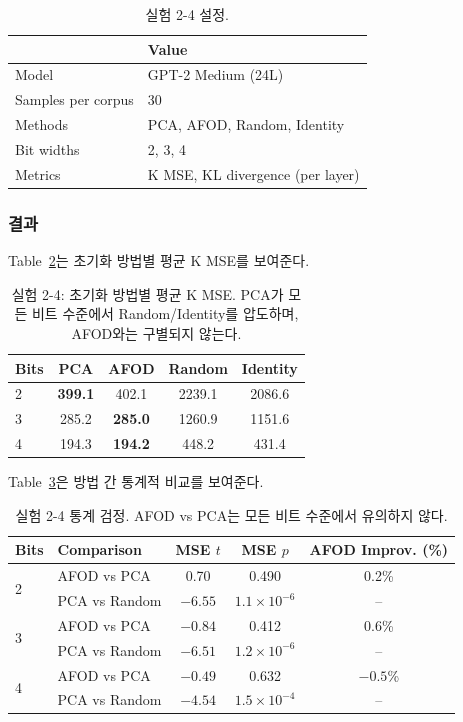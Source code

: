 \documentclass[11pt,a4paper]{article}
\begin{document}
\begin{table}[H]
\centering
\caption{실험 2-4 설정.}
\label{tab:exp24_setup}
\begin{tabular}{ll}
\toprule
\textbf{} & \textbf{Value} \\
\midrule
Model & GPT-2 Medium (24L) \\
Samples per corpus & 30 \\
Methods & PCA, AFOD, Random, Identity \\
Bit widths & 2, 3, 4 \\
Metrics & K MSE, KL divergence (per layer) \\
\bottomrule
\end{tabular}
\end{table}

\subsubsection{결과}

Table~\ref{tab:exp24_mse}는 초기화 방법별 평균 K MSE를 보여준다.

\begin{table}[H]
\centering
\caption{실험 2-4: 초기화 방법별 평균 K MSE. PCA가 모든 비트 수준에서 Random/Identity를 압도하며, AFOD와는 구별되지 않는다.}
\label{tab:exp24_mse}
\begin{tabular}{lcccc}
\toprule
\textbf{Bits} & \textbf{PCA} & \textbf{AFOD} & \textbf{Random} & \textbf{Identity} \\
\midrule
2 & \textbf{399.1} & 402.1 & 2239.1 & 2086.6 \\
3 & 285.2 & \textbf{285.0} & 1260.9 & 1151.6 \\
4 & 194.3 & \textbf{194.2} & 448.2 & 431.4 \\
\bottomrule
\end{tabular}
\end{table}

Table~\ref{tab:exp24_stat}은 방법 간 통계적 비교를 보여준다.

\begin{table}[H]
\centering
\caption{실험 2-4 통계 검정. AFOD vs PCA는 모든 비트 수준에서 유의하지 않다.}
\label{tab:exp24_stat}
\begin{tabular}{llccc}
\toprule
\textbf{Bits} & \textbf{Comparison} & \textbf{MSE $t$} & \textbf{MSE $p$} & \textbf{AFOD Improv. (\%)} \\
\midrule
\multirow{2}{*}{2} & AFOD vs PCA & 0.70 & 0.490 & 0.2\% \\
 & PCA vs Random & $-6.55$ & $1.1 \times 10^{-6}$ & -- \\
\midrule
\multirow{2}{*}{3} & AFOD vs PCA & $-0.84$ & 0.412 & 0.6\% \\
 & PCA vs Random & $-6.51$ & $1.2 \times 10^{-6}$ & -- \\
\midrule
\multirow{2}{*}{4} & AFOD vs PCA & $-0.49$ & 0.632 & $-0.5$\% \\
 & PCA vs Random & $-4.54$ & $1.5 \times 10^{-4}$ & -- \\
\bottomrule
\end{tabular}
\end{table}
\end{document}
